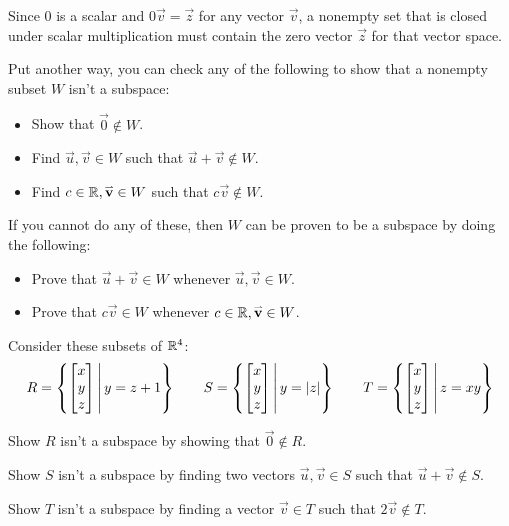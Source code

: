 \begin{applicationActivities}
\begin{remark}
Since \(0\) is a scalar and \(0\vec{v}=\vec{z}\) for any vector \(\vec{v}\), a
nonempty set that is closed under scalar multiplication must contain the zero vector
\(\vec{z}\) for that vector space.

\vspace{1em}

Put another way, you can check any of the following to show that a
nonempty subset \(W\) isn't a subspace:

\begin{itemize}
  \item Show that \(\vec 0\not\in W\). 
  \item Find \(\vec u,\vec v\in W\) such that \(\vec u+\vec v\not\in W\).
  \item Find \(c\in\mathbb{R},\mathbf{\accentset{\rightharpoonup}{v}}\in W\) such that \(c\vec v\not\in W\).
\end{itemize}

If you cannot do any of these, then \(W\) can be proven to be a subspace
by doing the following:
\begin{itemize}
  \item Prove that \(\vec u+\vec v\in W\) whenever \(\vec u,\vec v\in W\).
  \item Prove that \(c\vec v\in W\) whenever \(c\in\mathbb{R},\mathbf{\accentset{\rightharpoonup}{v}}\in W\).
\end{itemize}
\end{remark}

\begin{activity}{20}
  Consider these subsets of \(\mathbb{R}^4\):
  \[
    R=
    \left\{ \begin{bmatrix}x\\y\\z\end{bmatrix}\,\middle|\,y=z+1\right\}
    \hspace{2em}
    S=
    \left\{ \begin{bmatrix}x\\y\\z\end{bmatrix}\,\middle|\,y=|z|\right\}
    \hspace{2em}
    T=
    \left\{ \begin{bmatrix}x\\y\\z\end{bmatrix}\,\middle|\,z=xy\right\}
  \]
  \begin{subactivity}
  Show \(R\) isn't a subspace by showing that \(\vec 0\not\in R\).
  \end{subactivity}
  \begin{subactivity}
  Show \(S\) isn't a subspace by finding two vectors \(\vec u,\vec v\in S\)
  such that \(\vec u+\vec v\not\in S\).
  \end{subactivity}
  \begin{subactivity}
  Show \(T\) isn't a subspace by finding a vector \(\vec v\in T\)
  such that \(2\vec v\not\in T\).
  \end{subactivity}
\end{activity}




\end{applicationActivities}
